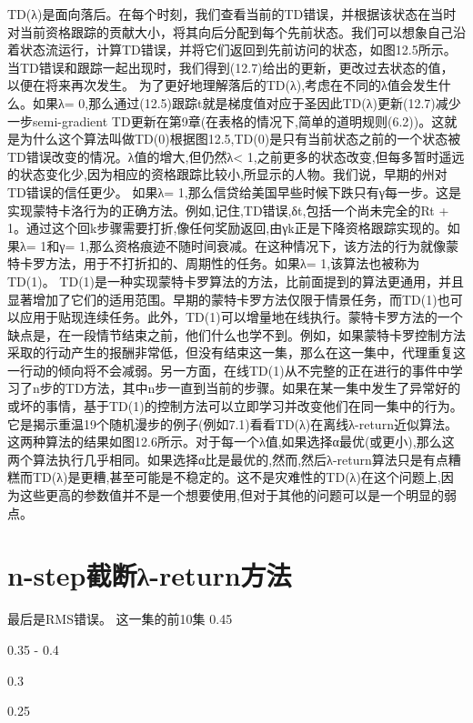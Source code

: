 TD(λ)是面向落后。在每个时刻，我们查看当前的TD错误，并根据该状态在当时对当前资格跟踪的贡献大小，将其向后分配到每个先前状态。我们可以想象自己沿着状态流运行，计算TD错误，并将它们返回到先前访问的状态，如图12.5所示。当TD错误和跟踪一起出现时，我们得到(12.7)给出的更新，更改过去状态的值，以便在将来再次发生。
为了更好地理解落后的TD(λ),考虑在不同的λ值会发生什么。如果λ= 0,那么通过(12.5)跟踪t就是梯度值对应于圣因此TD(λ)更新(12.7)减少一步semi-gradient TD更新在第9章(在表格的情况下,简单的道明规则(6.2))。这就是为什么这个算法叫做TD(0)根据图12.5,TD(0)是只有当前状态之前的一个状态被TD错误改变的情况。λ值的增大,但仍然λ< 1,之前更多的状态改变,但每多暂时遥远的状态变化少,因为相应的资格跟踪比较小,所显示的人物。我们说，早期的州对TD错误的信任更少。
如果λ= 1,那么信贷给美国早些时候下跌只有γ每一步。这是实现蒙特卡洛行为的正确方法。例如,记住,TD错误,δt,包括一个尚未完全的Rt + 1。通过这个回k步骤需要打折,像任何奖励返回,由γk正是下降资格跟踪实现的。如果λ= 1和γ= 1,那么资格痕迹不随时间衰减。在这种情况下，该方法的行为就像蒙特卡罗方法，用于不打折扣的、周期性的任务。如果λ= 1,该算法也被称为TD(1)。
TD(1)是一种实现蒙特卡罗算法的方法，比前面提到的算法更通用，并且显著增加了它们的适用范围。早期的蒙特卡罗方法仅限于情景任务，而TD(1)也可以应用于贴现连续任务。此外，TD(1)可以增量地在线执行。蒙特卡罗方法的一个缺点是，在一段情节结束之前，他们什么也学不到。例如，如果蒙特卡罗控制方法采取的行动产生的报酬非常低，但没有结束这一集，那么在这一集中，代理重复这一行动的倾向将不会减弱。另一方面，在线TD(1)从不完整的正在进行的事件中学习了n步的TD方法，其中n步一直到当前的步骤。如果在某一集中发生了异常好的或坏的事情，基于TD(1)的控制方法可以立即学习并改变他们在同一集中的行为。
它是揭示重温19个随机漫步的例子(例如7.1)看看TD(λ)在离线λ-return近似算法。这两种算法的结果如图12.6所示。对于每一个λ值,如果选择α最优(或更小),那么这两个算法执行几乎相同。如果选择α比是最优的,然而,然后λ-return算法只是有点糟糕而TD(λ)是更糟,甚至可能是不稳定的。这不是灾难性的TD(λ)在这个问题上,因为这些更高的参数值并不是一个想要使用,但对于其他的问题可以是一个明显的弱点。

\section{n-step截断λ-return方法}

最后是RMS错误。
这一集的前10集
0.45




0.35 - 0.4




0.3



0.25



